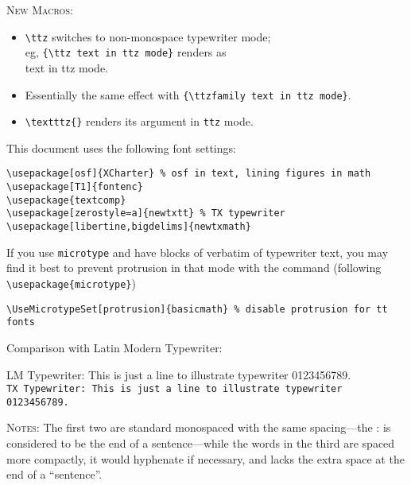 \documentclass{article}
\begin{document}
\textsc{New Macros:}
\begin{itemize}
\item
\verb|\ttz| switches to non-monospace typewriter mode; \\
eg, \verb|{\ttz text in ttz mode}| renders as \\
{\ttz text in ttz mode}.
\item Essentially the same effect with \verb|{\ttzfamily text in ttz mode}|.
\item \verb|\textttz{}| renders its argument in {\tt ttz} mode.
\end{itemize}

This document uses the following font settings:
\begin{verbatim}
\usepackage[osf]{XCharter} % osf in text, lining figures in math
\usepackage[T1]{fontenc}
\usepackage{textcomp}
\usepackage[zerostyle=a]{newtxtt} % TX typewriter
\usepackage[libertine,bigdelims]{newtxmath}
\end{verbatim}

If you use {\tt microtype} and have blocks of verbatim of typewriter text, you may find it best to prevent protrusion in that mode with the command (following \verb|\usepackage{microtype}|)\begin{verbatim}
\UseMicrotypeSet[protrusion]{basicmath} % disable protrusion for tt fonts
\end{verbatim}

Comparison with Latin Modern Typewriter: 

{\fontsize{11.22pt}{13}\selectfont LM Typewriter: This is just a line to illustrate typewriter 0123456789.}\\
\texttt{TX Typewriter: This is just a line to illustrate typewriter 0123456789.}\\

\textsc{Notes:} The first two are standard monospaced with the same spacing---the : is considered to be the end of a sentence---while the words in the third are  spaced more compactly, it would hyphenate if necessary, and lacks the extra space at the end of a ``sentence''.
\end{document}
